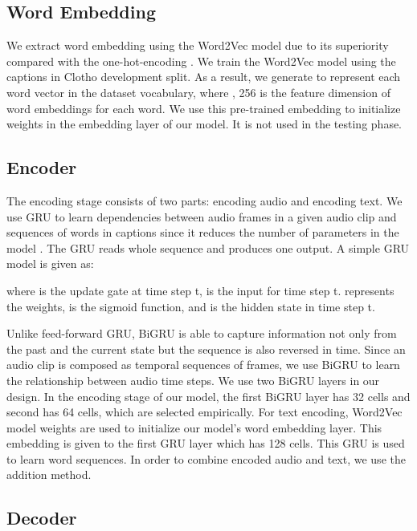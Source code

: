 \documentclass{article}
\begin{document}
\subsection{Word Embedding}

We extract word embedding using the Word2Vec model due to its superiority compared with the one-hot-encoding \cite{DBLP:journals/corr/MikolovSCCD13}. We train the Word2Vec model using the captions in Clotho development split. As a result, we generate   to represent each word vector in the dataset vocabulary, where , 256 is the feature dimension of word embeddings for each word. We use this pre-trained embedding to initialize weights in the embedding layer of our model. It is not used in the testing phase. 

\subsection{Encoder}

The encoding stage consists of two parts: encoding audio and encoding text. We use GRU to learn dependencies between audio frames in a given audio clip and sequences of words in captions since it reduces the number of parameters in the model \cite{DBLP:journals/corr/Lipton15}. The GRU reads whole sequence and produces one output. A simple GRU model is given as:

 

 

 

 
where   is the update gate at time step t,  is the input for time step t.  represents the weights,  is the sigmoid function, and  is the hidden state in time step t.

Unlike feed-forward GRU, BiGRU is able to capture information not only from the past and the current state but the sequence is also reversed in time. Since an audio clip is composed as temporal sequences of frames, we use BiGRU to learn the relationship between audio time steps. We use two BiGRU layers in our design. In the encoding stage of our model, the first BiGRU layer has 32 cells and second has 64 cells, which are selected empirically. For text encoding, Word2Vec model weights are used to initialize our model’s word embedding layer. This embedding is given to the first GRU layer which has 128 cells. This GRU is used to learn word sequences. In order to combine encoded audio and text, we use the addition method.

\subsection{Decoder}
\end{document}
